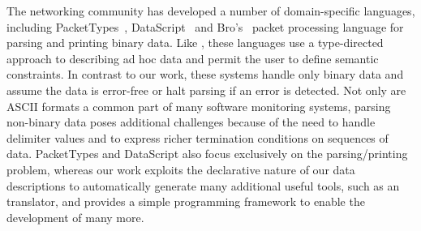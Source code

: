 



The networking community has developed a number of domain-specific
languages, including PacketTypes~\cite{sigcomm00}, DataScript~\cite{gpce02}
and Bro's~\cite{paxson:bro} packet processing language
for parsing and printing binary data.  
Like \padsml{}, these languages use a type-directed
approach to describing ad hoc data and permit the user to define
semantic constraints.  In contrast to our work, these systems handle
only binary data and assume the data is error-free or halt parsing if
an error is detected.  Not only are ASCII formats a common part of
many software monitoring systems, parsing non-binary data poses additional
challenges because of the need to handle delimiter values and to
express richer termination conditions on sequences of data. 
PacketTypes and DataScript also focus exclusively on the 
parsing/printing problem,
whereas our work exploits the declarative nature of our data
descriptions to automatically generate many additional useful tools, 
such as an \xml{} translator, and provides a simple programming framework
to enable the development of many more.  

